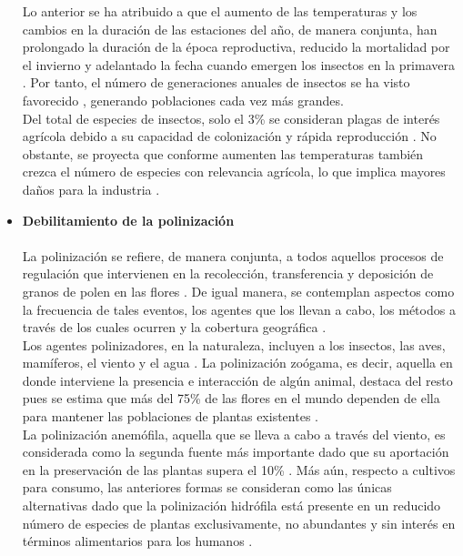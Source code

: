 \begin{itemize}[leftmargin=0cm, itemsep=0.5 cm]
{	Lo anterior se ha atribuido a que el aumento de las temperaturas y los cambios en la duración de las estaciones del año, de manera conjunta, han prolongado la duración de la época reproductiva, reducido la mortalidad por el invierno y adelantado la fecha cuando emergen los insectos en la primavera \cite{Kiritani_2013}. Por tanto, el número de generaciones anuales de insectos se ha visto favorecido \cite{Harvey_2022}, generando poblaciones cada vez más grandes.\\
	
	Del total de especies de insectos, solo el 3\% se consideran plagas de interés agrícola debido a su capacidad de colonización y rápida reproducción \cite{Garcia-Lara_2016}. No obstante, se proyecta que conforme aumenten las temperaturas también crezca el número de especies con relevancia agrícola, lo que implica mayores daños para la industria \cite{Deutsch_2018}.
	}
	
	\item[]\textbf{Debilitamiento de la polinización\\}\\
	{
	La polinización se refiere, de manera conjunta, a todos aquellos procesos de regulación que intervienen en la recolección, transferencia y deposición de granos de polen en las flores \cite{Liss_2013}. De igual manera, se contemplan aspectos como la frecuencia de tales eventos, los agentes que los llevan a cabo, los métodos a través de los cuales ocurren y la cobertura geográfica \cite{Carvalheiro_2010, Westerkamp_2000}.\\
	
	Los agentes polinizadores, en la naturaleza, incluyen a los insectos, las aves, mamíferos, el viento y el agua \cite{Amrutwad_2024}. La polinización zoógama, es decir, aquella en donde interviene la presencia e interacción de algún animal, destaca del resto pues se estima que más del 75\% de las flores en el mundo dependen de ella para mantener las poblaciones de plantas existentes \cite{Ollerton_2011}.\\
	
	La polinización anemófila, aquella que se lleva a cabo a través del viento, es considerada como la segunda fuente más importante dado que su aportación en la preservación de las plantas supera el 10\% \cite{Friedman_2009}. Más aún, respecto a cultivos para consumo, las anteriores formas se consideran como las únicas alternativas dado que la polinización hidrófila está presente en un reducido número de especies de plantas exclusivamente, no abundantes y sin interés en términos alimentarios para los humanos \cite{Clemente_2023}.\\
	
}
\end{itemize}
